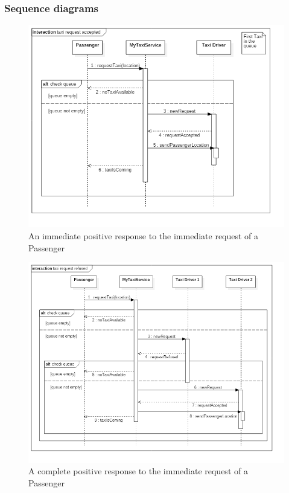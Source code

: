 \subsubsection{Sequence diagrams}
\begin{figure}[H]
\centering
\includegraphics[scale=0.6]{Images/sequence_taxi_request_accepted}
\caption{An immediate positive response to the immediate request of a Passenger}
\end{figure}

\begin{figure}[H]
\centering
\includegraphics[scale=0.5]{Images/sequence_taxi_request_refused}
\caption{A complete positive response to the immediate request of a Passenger}
\end{figure}

